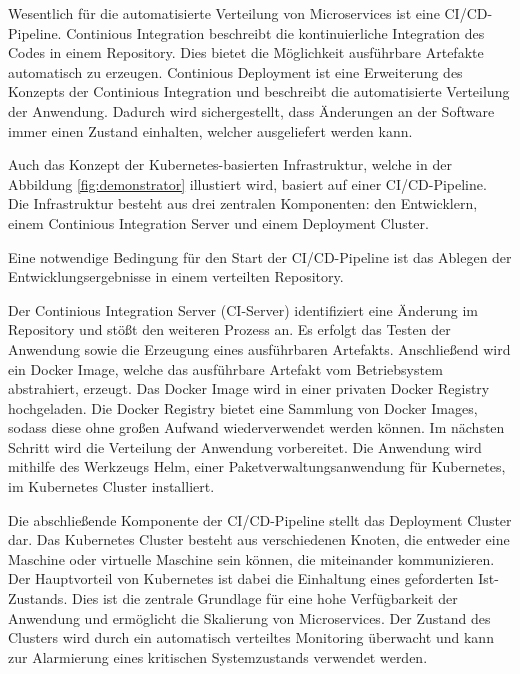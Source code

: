 Wesentlich für die automatisierte Verteilung von Microservices ist eine CI/CD-Pipeline.
Continious Integration beschreibt die kontinuierliche Integration des Codes in einem Repository.
Dies bietet die Möglichkeit ausführbare Artefakte automatisch zu erzeugen.
Continious Deployment ist eine Erweiterung des Konzepts der Continious Integration und beschreibt die automatisierte Verteilung der Anwendung.
Dadurch wird sichergestellt, dass Änderungen an der Software immer einen Zustand einhalten, welcher ausgeliefert werden kann.

Auch das Konzept der Kubernetes-basierten Infrastruktur, welche in der Abbildung \ref{fig:demonstrator} illustiert wird, basiert auf einer CI/CD-Pipeline.
Die Infrastruktur besteht aus drei zentralen Komponenten: den Entwicklern, einem Continious Integration Server und einem Deployment Cluster.

Eine notwendige Bedingung für den Start der CI/CD-Pipeline ist das Ablegen der Entwicklungsergebnisse in einem verteilten Repository.

Der Continious Integration Server (CI-Server) identifiziert eine Änderung im Repository und stößt den weiteren Prozess an.
Es erfolgt das Testen der Anwendung sowie die Erzeugung eines ausführbaren Artefakts.
Anschließend wird ein Docker Image, welche das ausführbare Artefakt vom Betriebsystem abstrahiert, erzeugt.
Das Docker Image wird in einer privaten Docker Registry hochgeladen.
Die Docker Registry bietet eine Sammlung von Docker Images, sodass diese ohne großen Aufwand wiederverwendet werden können.
Im nächsten Schritt wird die Verteilung der Anwendung vorbereitet. 
Die Anwendung wird mithilfe des Werkzeugs Helm, einer Paketverwaltungsanwendung für Kubernetes, im Kubernetes Cluster installiert.

Die abschließende Komponente der CI/CD-Pipeline stellt das Deployment Cluster dar.
Das Kubernetes Cluster besteht aus verschiedenen Knoten, die entweder eine Maschine oder virtuelle Maschine sein können, die miteinander kommunizieren.
Der Hauptvorteil von Kubernetes ist dabei die Einhaltung eines geforderten Ist-Zustands.
Dies ist die zentrale Grundlage für eine hohe Verfügbarkeit der Anwendung und ermöglicht die Skalierung von Microservices.
Der Zustand des Clusters wird durch ein automatisch verteiltes Monitoring überwacht und kann zur Alarmierung eines kritischen Systemzustands verwendet werden.

